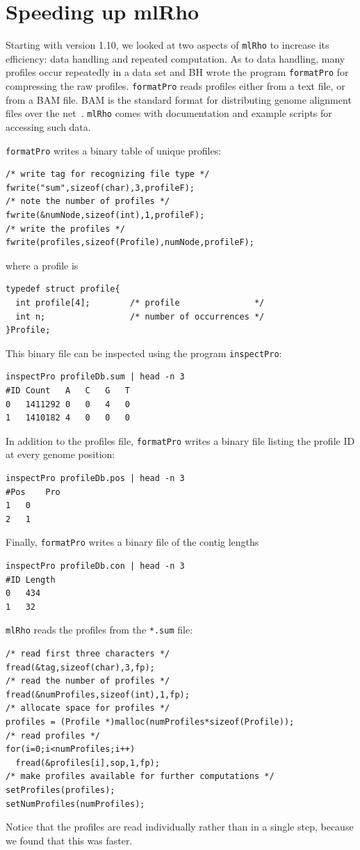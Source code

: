 \documentclass{sig-alternate}
\newcommand{\ty}{\texttt}
\begin{document}
\section{Speeding up mlRho}
Starting with version 1.10, we looked at two aspects of \ty{mlRho} to
increase its efficiency: data handling and repeated
computation. As to data handling, many profiles occur repeatedly in a
data set and BH wrote the program \ty{formatPro} for compressing the raw
profiles. \ty{formatPro} reads profiles either from a text file, or from a BAM
file. BAM is the standard format for distributing genome alignment
files over the net~\citep{li09:seq}. \ty{mlRho} comes with documentation and example
scripts for accessing such data.

\ty{formatPro} writes a binary table of unique
profiles:
\begin{lstlisting}
/* write tag for recognizing file type */
fwrite("sum",sizeof(char),3,profileF);
/* note the number of profiles */
fwrite(&numNode,sizeof(int),1,profileF);
/* write the profiles */
fwrite(profiles,sizeof(Profile),numNode,profileF);
\end{lstlisting}
where a profile is
\begin{lstlisting}
typedef struct profile{  
  int profile[4];        /* profile               */
  int n;                 /* number of occurrences */
}Profile;
\end{lstlisting}
This binary file can be inspected using the program \ty{inspectPro}:
\begin{verbatim}
inspectPro profileDb.sum | head -n 3
#ID	Count	A	C	G	T
0	1411292	0	0	4	0
1	1410182	4	0	0	0
\end{verbatim}
In addition to the profiles file, \ty{formatPro} writes a binary file
listing the profile ID at every genome position:
\begin{verbatim}
inspectPro profileDb.pos | head -n 3
#Pos	Pro
1	0
2	1
\end{verbatim}
Finally, \ty{formatPro} writes a binary file of the contig lengths
\begin{verbatim}
inspectPro profileDb.con | head -n 3
#ID	Length
0	434
1	32
\end{verbatim}

\ty{mlRho} reads the profiles from the \ty{*.sum} file:
\begin{lstlisting}
/* read first three characters */
fread(&tag,sizeof(char),3,fp);
/* read the number of profiles */
fread(&numProfiles,sizeof(int),1,fp);
/* allocate space for profiles */
profiles = (Profile *)malloc(numProfiles*sizeof(Profile));
/* read profiles */
for(i=0;i<numProfiles;i++)
  fread(&profiles[i],sop,1,fp);
/* make profiles available for further computations */
setProfiles(profiles);
setNumProfiles(numProfiles);
\end{lstlisting}
Notice that the profiles are read individually rather than in a single
step, because we found that this was
faster. 
\end{document}
